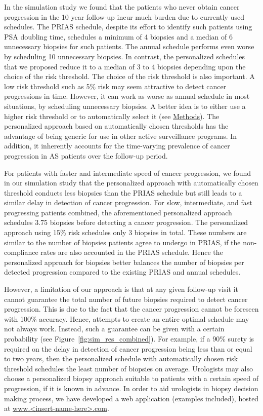 In the simulation study we found that the patients who never obtain cancer progression in the 10 year follow-up incur much burden due to currently used schedules. The PRIAS schedule, despite its effort to identify such patients using PSA doubling time, schedules a minimum of 4 biopsies and a median of 6 unnecessary biopsies for such patients. The annual schedule performs even worse by scheduling 10 unnecessary biopsies. In contrast, the personalized schedules that we proposed reduce it to a median of 3 to 4 biopsies depending upon the choice of the risk threshold. The choice of the risk threshold is also important. A low risk threshold such as 5\% risk may seem attractive to detect cancer progressions in time. However, it can work as worse as annual schedule in most situations, by scheduling unnecessary biopsies. A better idea is to either use a higher risk threshold or to automatically select it (see \hyperref[sec:methods]{Methods}). The personalized approach based on automatically chosen thresholds has the advantage of being generic for use in other active surveillance programs. In addition, it inherently accounts for the time-varying prevalence of cancer progression in AS patients over the follow-up period.

For patients with faster and intermediate speed of cancer progression, we found in our simulation study that the personalized approach with automatically chosen threshold conducts less biopsies than the PRIAS schedule but still leads to a similar delay in detection of cancer progression. For slow, intermediate, and fast progressing patients combined, the aforementioned personalized approach schedules 3.75 biopsies before detecting a cancer progression. The personalized approach using 15\% risk schedules only 3 biopsies in total. These numbers are similar to the number of biopsies patients agree to undergo in PRIAS, if the non-compliance rates \cite{bokhorst2015compliance} are also accounted in the PRIAS schedule. Hence the personalized approach for biopsies better balances the number of biopsies per detected progression compared to the existing PRIAS and annual schedules.

However, a limitation of our approach is that at any given follow-up visit it cannot guarantee the total number of future biopsies required to detect cancer progression. This is due to the fact that the cancer progression cannot be foreseen with 100\% accuracy. Hence, attempts to create an entire optimal schedule may not always work. Instead, such a guarantee can be given with a certain probability (see Figure~\ref{fig:sim_res_combined}). For example, if a 90\% surety is required on the delay in detection of cancer progression being less than or equal to two years, then the personalized schedule with automatically chosen risk threshold schedules the least number of biopsies on average. Urologists may also choose a personalized biopsy approach suitable to patients with a certain speed of progression, if it is known in advance. In order to aid urologists in biopsy decision making process, we have developed a web application (examples included), hosted at \url{www.<insert-name-here>.com}.
 

